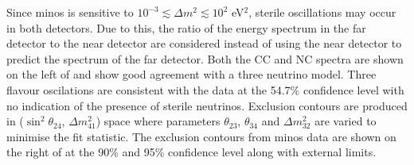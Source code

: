 Since \gls{minos} is sensitive to $10^{-3} \lesssim \Delta m^2 \lesssim 10^2$ eV$^2$, sterile oscillations may occur in both detectors. Due to this, the ratio of the energy spectrum in the far detector to the near detector are considered instead of using the near detector to predict the spectrum of the far detector. Both the CC and NC spectra are shown on the left of  and show good agreement with a three neutrino model. Three flavour oscilations are consistent with the data at the 54.7\% confidence level with no indication of the presence of sterile neutrinos. Exclusion contours are produced in ($\sin^2{\theta_{24}}$, $\Delta m^2_{41}$) space where parameters $\theta_{23}$, $\theta_{34}$ and $\Delta m^2_{32}$ are varied to minimise the fit statistic. The exclusion contours from \gls{minos} data are shown on the right of  at the 90\% and 95\% confidence level along with external limits. 

